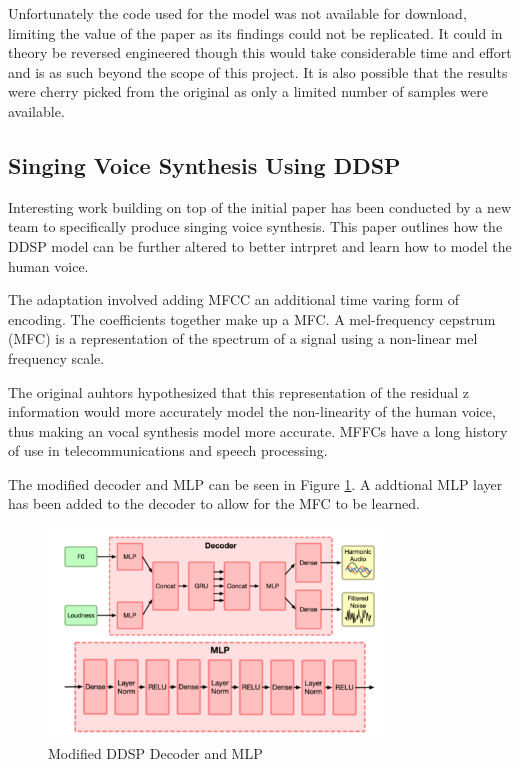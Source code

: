 Unfortunately the code used for the model was not available for download, limiting the value of the paper as its findings could not be replicated. It could in theory be reversed engineered though this would take considerable time and effort and is as such beyond the scope of this project. It is also possible that the results were cherry picked from the original as only a limited number of samples were available.

\subsection{Singing Voice Synthesis Using DDSP}
\label{sec:singing_voice_synthesis}

Interesting work building on top of the initial paper has been conducted by a new team to specifically produce singing voice synthesis\cite{SingingDDSP}. This paper outlines how the DDSP model can be further altered to better intrpret and learn how to model the human voice.

The adaptation involved adding \acrfull{MFCC} an additional time varing form of encoding. The coefficients together make up a \acrfull{MFC}. A mel-frequency cepstrum (MFC) is a representation of the spectrum of a signal using a non-linear mel frequency scale.

The original auhtors hypothesized that this representation of the residual z information would more accurately model the non-linearity of the human voice, thus making an vocal synthesis model more accurate. MFFCs have a long history of use in telecommunications and speech processing\cite{MFCCHistory}.

The modified decoder and MLP can be seen in Figure \ref{fig:singing_decoder_mlp}. A addtional MLP layer has been added to the decoder to allow for the MFC to be learned.

\begin{figure}
    \centering
    \includegraphics[width=0.8\textwidth]{literature_review/SingingDecoderMLP.png}
    \caption{Modified DDSP Decoder and MLP\cite{SingingDDSP}}
    \label{fig:singing_decoder_mlp}
\end{figure}


